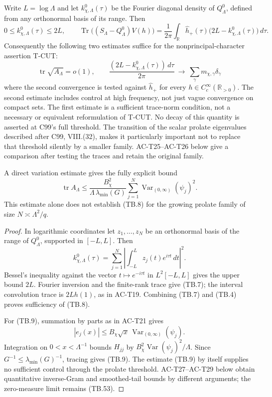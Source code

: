 \begin{proposition}
\label{AC-T23}
Write \(L=\log\Lambda\) and let
\(k^0_{\chi,\Lambda}(\tau)\) be the Fourier diagonal density
of \(Q_\Lambda^0\), defined from any orthonormal basis of its
range.  Then
\[
 0\leq k^0_{\chi,\Lambda}(\tau)\leq2L,\qquad
 \operatorname{Tr}\bigl((S_\Lambda-Q_\Lambda^0)V(h)\bigr)
 =\frac1{2\pi}\int_{\mathbb R}
       \widehat h_+(\tau)\bigl(2L-k^0_{\chi,\Lambda}(\tau)\bigr)
       \,d\tau.
 \tag{TB.7}
\]
Consequently the following two estimates suffice for the
nonprincipal-character assertion T-CUT:
\[
 \operatorname{tr}\sqrt{A_\Lambda}=o(1),\qquad
 \frac{(2L-k^0_{\chi,\Lambda}(\tau))\,d\tau}{2\pi}
  \ \longrightarrow\ \sum_\gamma m_{\chi,\gamma}\delta_\gamma
 \tag{TB.8}
\]
where the second convergence is tested against
\(\widehat h_+\) for every \(h\in C_c^\infty(\mathbb R_{>0})\).
The second estimate includes control at high frequency,
not just vague convergence on compact sets.
The first estimate is a sufficient trace-norm condition,
not a necessary or equivalent reformulation of T-CUT.
No decay of this quantity is asserted at C99's full
threshold.  The transition of the scalar prolate eigenvalues
described after C99, VIII.(32), makes it particularly important
not to replace that threshold silently by a smaller family.
AC-T25--AC-T26 below give a comparison after testing the
traces and retain the original family.

A direct variation estimate gives the fully explicit bound
\[
 \operatorname{tr}A_\Lambda
 \leq\frac{B_\chi^2}{\Lambda\,\lambda_{\min}(G)}
        \sum_{j=1}^N
          \operatorname{Var}_{(0,\infty)}(\psi_j)^2 .
 \tag{TB.9}
\]
This estimate alone does not establish (TB.8) for the
growing prolate family of size \(N\asymp\Lambda^2/q\).
\end{proposition}
\begin{proof}
In logarithmic coordinates let \(z_1,\ldots,z_N\) be an
orthonormal basis of the range of \(Q_\Lambda^0\),
supported in \([-L,L]\).
Then
\[
 k^0_{\chi,\Lambda}(\tau)
       =\sum_{j=1}^N\left|
                  \int_{-L}^Lz_j(t)e^{i\tau t}\,dt\right|^2.
 \]
Bessel's inequality against the vector
\(t\mapsto e^{-i\tau t}\) in \(L^2[-L,L]\) gives the upper
bound \(2L\).  Fourier inversion and the finite-rank trace
give (TB.7); the interval convolution trace is
\(2Lh(1)\), as in AC-T19.
Combining (TB.7) and (TB.4) proves sufficiency of (TB.8).

For (TB.9), summation by parts as in AC-T21 gives
\[
 |e_j(x)|\leq B_\chi\sqrt{x}\,
                     \operatorname{Var}_{(0,\infty)}(\psi_j).
 \]
Integration on \(0<x<\Lambda^{-1}\) bounds \(H_{jj}\)
by \(B_\chi^2\operatorname{Var}(\psi_j)^2/\Lambda\).
Since \(G^{-1}\leq\lambda_{\min}(G)^{-1}\), tracing gives
(TB.9).  The estimate (TB.9) by itself supplies no sufficient control
through the prolate threshold.  AC-T27--AC-T29 below obtain
quantitative inverse-Gram and smoothed-tail bounds by different
arguments; the zero-measure limit remains (TB.53).
\end{proof}

